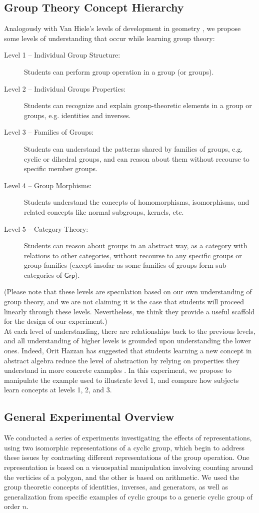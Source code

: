 \documentclass[11pt]{article}
\begin{document}
\subsection{Group Theory Concept Hierarchy}
Analogously with Van Hiele's levels of development in geometry \cite{Burger1986}, we propose some levels of understanding that occur while learning group theory:
\begin{description}
\item[Level 1 -- Individual Group Structure:] Students can perform group operation in a group (or groups).
\item[Level 2 -- Individual Groups Properties:] Students can recognize and explain group-theoretic elements in a group or groups, e.g. identities and inverses.
\item[Level 3 -- Families of Groups:] Students can understand the patterns shared by families of groups, e.g. cyclic or dihedral groups, and can reason about them without recourse to specific member groups.
\item[Level 4 -- Group Morphisms:] Students understand the concepts of homomorphisms, isomorphisms, and related concepts like normal subgroups, kernels, etc.
\item[Level 5 -- Category Theory:] Students can reason about groups in an abstract way, as a category with relations to other categories, without recourse to any specific groups or group families (except insofar as some families of groups form sub-categories of $\mathsf{Grp}$).
\end{description}
(Please note that these levels are speculation based on our own understanding of group theory, and we are not claiming it is the case that students will proceed linearly through these levels. Nevertheless, we think they provide a useful scaffold for the design of our experiment.) \\[11pt]
At each level of understanding, there are relationships back to the previous levels, and all understanding of higher levels is grounded upon understanding the lower ones. Indeed, Orit Hazzan has suggested that students learning a new concept in abstract algebra reduce the level of abstraction by relying on properties they understand in more concrete examples \cite{Hazzan1999}. In this experiment, we propose to manipulate the example used to illustrate level 1, and compare how subjects learn concepts at levels 1, 2, and 3.\\[11pt] 
\subsection{General Experimental Overview}
We conducted a series of experiments investigating the effects of representations, using two isomorphic representations of a cyclic group, which begin to address these issues by contrasting different representations of the group operation. One representation is based on a visuospatial manipulation involving counting around the verticies of a polygon, and the other is based on arithmetic. We used the group theoretic concepts of identities, inverses, and generators, as well as generalization from specific examples of cyclic groups to a generic cyclic group of order $n$. 
\end{document}

